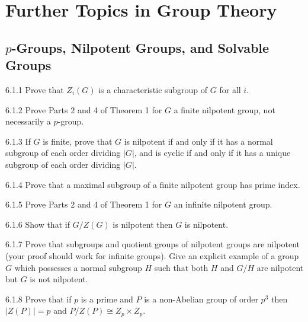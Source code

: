 \section{Further Topics in Group Theory}

\subsection{$p$-Groups, Nilpotent Groups, and Solvable Groups}

\begin{exercise}{6.1.1}
    Prove that $Z_i(G)$ is a characteristic subgroup of $G$ for all $i$.
\end{exercise}

\begin{exercise}{6.1.2}
    Prove Parts 2 and 4 of Theorem 1 for $G$ a finite nilpotent group, not necessarily a $p$-group.
\end{exercise}

\begin{exercise}{6.1.3}
    If $G$ is finite, prove that $G$ is nilpotent if and only if it has a normal subgroup of each order dividing $|G|$, and is cyclic if and only if it has a unique subgroup of each order dividing $|G|$.
\end{exercise}

\begin{exercise}{6.1.4}
    Prove that a maximal subgroup of a finite nilpotent group has prime index.
\end{exercise}

\begin{exercise}{6.1.5}
    Prove Parts 2 and 4 of Theorem 1 for $G$ an infinite nilpotent group.
\end{exercise}

\begin{exercise}{6.1.6}
    Show that if $G/Z(G)$ is nilpotent then $G$ is nilpotent.
\end{exercise}

\begin{exercise}{6.1.7}
    Prove that subgroups and quotient groups of nilpotent groups are nilpotent (your proof should work for infinite groups).
    Give an explicit example of a group $G$ which possesses a normal subgroup $H$ such that both $H$ and $G/H$ are nilpotent but $G$ is not nilpotent.
\end{exercise}

\begin{exercise}{6.1.8}
    Prove that if $p$ is a prime and $P$ is a non-Abelian group of order $p^3$ then $|Z(P)| = p$ and $P/Z(P) \cong Z_p \times Z_p$.
\end{exercise}

